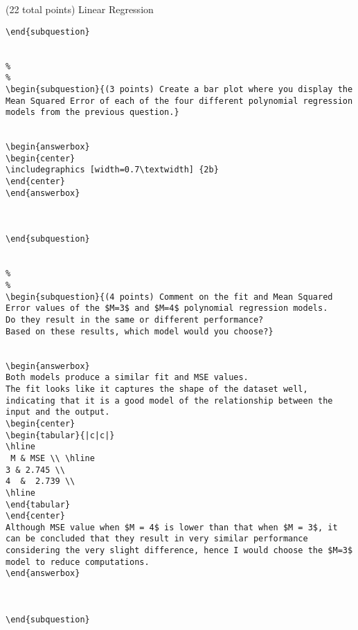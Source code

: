 \documentclass[12pt]{article}
\begin{document}
\begin{question}{(22 total points) Linear Regression}
\begin{subquestion}
\begin{answerbox}{20em}
\begin {verbatim}
\end{subquestion}


%
%
\begin{subquestion}{(3 points) Create a bar plot where you display the Mean Squared Error of each of the four different polynomial regression models from the previous question.}


\begin{answerbox}{35em}
\begin{center}
\includegraphics [width=0.7\textwidth] {2b}
\end{center}
\end{answerbox}



\end{subquestion}


%
%
\begin{subquestion}{(4 points) Comment on the fit and Mean Squared Error values of the $M=3$ and $M=4$ polynomial regression models. 
Do they result in the same or different performance? 
Based on these results, which model would you choose?}


\begin{answerbox}{15em}
Both models produce a similar fit and MSE values. 
The fit looks like it captures the shape of the dataset well, indicating that it is a good model of the relationship between the input and the output.
\begin{center}
\begin{tabular}{|c|c|}
\hline
 M & MSE \\ \hline
3 & 2.745 \\
4  &  2.739 \\
\hline
\end{tabular}
\end{center}
Although MSE value when $M = 4$ is lower than that when $M = 3$, it can be concluded that they result in very similar performance considering the very slight difference, hence I would choose the $M=3$ model to reduce computations.
\end{answerbox}



\end{subquestion}




\end{verbatim}
\end{answerbox}
\end{subquestion}
\end{question}
\end{document}
